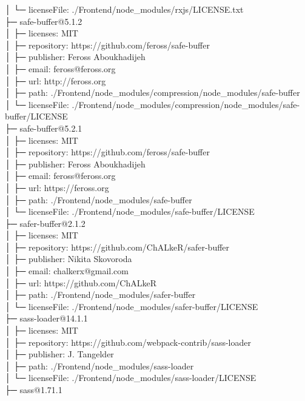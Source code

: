 │  └─ licenseFile: ./Frontend/node\_modules/rxjs/LICENSE.txt\\
├─ safe-buffer@5.1.2\\
│  ├─ licenses: MIT\\
│  ├─ repository: https://github.com/feross/safe-buffer\\
│  ├─ publisher: Feross Aboukhadijeh\\
│  ├─ email: feross@feross.org\\
│  ├─ url: http://feross.org\\
│  ├─ path: ./Frontend/node\_modules/compression/node\_modules/safe-buffer\\
│  └─ licenseFile: ./Frontend/node\_modules/compression/node\_modules/safe-buffer/LICENSE\\
├─ safe-buffer@5.2.1\\
│  ├─ licenses: MIT\\
│  ├─ repository: https://github.com/feross/safe-buffer\\
│  ├─ publisher: Feross Aboukhadijeh\\
│  ├─ email: feross@feross.org\\
│  ├─ url: https://feross.org\\
│  ├─ path: ./Frontend/node\_modules/safe-buffer\\
│  └─ licenseFile: ./Frontend/node\_modules/safe-buffer/LICENSE\\
├─ safer-buffer@2.1.2\\
│  ├─ licenses: MIT\\
│  ├─ repository: https://github.com/ChALkeR/safer-buffer\\
│  ├─ publisher: Nikita Skovoroda\\
│  ├─ email: chalkerx@gmail.com\\
│  ├─ url: https://github.com/ChALkeR\\
│  ├─ path: ./Frontend/node\_modules/safer-buffer\\
│  └─ licenseFile: ./Frontend/node\_modules/safer-buffer/LICENSE\\
├─ sass-loader@14.1.1\\
│  ├─ licenses: MIT\\
│  ├─ repository: https://github.com/webpack-contrib/sass-loader\\
│  ├─ publisher: J. Tangelder\\
│  ├─ path: ./Frontend/node\_modules/sass-loader\\
│  └─ licenseFile: ./Frontend/node\_modules/sass-loader/LICENSE\\
├─ sass@1.71.1\\
